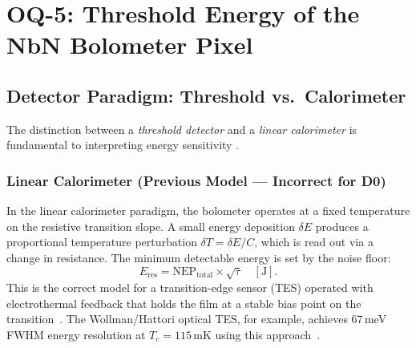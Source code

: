 %
%
%

\section{OQ-5: Threshold Energy of the NbN Bolometer Pixel}
\label{sec:oq5}

\subsection{Detector Paradigm: Threshold vs.\ Calorimeter}
\label{sec:oq5_paradigm}

The distinction between a \emph{threshold detector} and a \emph{linear
calorimeter} is fundamental to interpreting energy sensitivity
\cite{Richards1994}. %

\subsubsection{Linear Calorimeter (Previous Model --- Incorrect for D0)}

In the linear calorimeter paradigm, the bolometer operates at a fixed
temperature on the resistive transition slope. A small energy deposition
$\delta E$ produces a proportional temperature perturbation
$\delta T = \delta E / C$, which is read out via a change in resistance.
The minimum detectable energy is set by the noise floor:
\begin{equation}
  E_\mathrm{res} = \mathrm{NEP}_\mathrm{total} \times \sqrt{\tau}
  \quad [\text{J}].
  \label{eq:oq5_E_res_calorimeter}
\end{equation}
This is the correct model for a transition-edge sensor (TES) operated with
electrothermal feedback that holds the film at a stable bias point on the
transition~\cite{Richards1994}. %
The Wollman/Hattori optical TES, for example, achieves $67$\,meV
FWHM energy resolution at $T_c = 115$\,mK using this
approach~\cite{Wollman2022OpticalTES}. %

